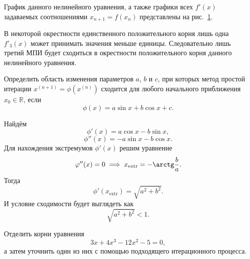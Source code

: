 \documentclass[a4paper]{article}
\begin{document}
\begin{sol}
График данного нелинейного уравнения, а также графики
всех $f'(x)$ задаваемых соотношениями $x_{n+1}=f(x_n)$
представлены на рис.~\ref{fig:1}.\begin{figure}[]
	\centering
	\caption{}
	\label{fig:1}
\end{figure}
В некоторой окрестности единственного
положительного корня лишь одна $f'_3(x)$ может принимать значения
меньше единицы. Следовательно лишь третий МПИ будет сходиться
в окрестности положительного корня данного нелинейного уравнения.
\end{sol} 
\begin{hiProb}[11.1а]
Определить область изменения параметров $a$, $b$ и $c$, при
которых метод простой итерации $x^{(n+1)}=\phi\left( x^{(n)} \right) $ сходится для любого начального приближения $x_0 \in \mathbb{R}$, если 
\[
	\phi(x)=a \sin x +b \cos x+c
.\] 
\end{hiProb}
\begin{sol}
Найдём
\[
	\phi'(x)=a \cos x-b \sin x
 ,\] 
\[
	\phi''(x)=-a \sin x- b \cos x
.\] 
Для нахождения экстремумов $\phi'(x)$ решим уравнение
\[
	\phi''(x)=0 \implies x_\text{extr} = -\arctg \frac{b}{a}
.\]
Тогда
\[
	\phi'(x_{\text{extr}})=\sqrt{a^2+b^2} 
.\] 
И условие сходимости будет выглядеть как
\[
\sqrt{a^2+b^2} <1
.\] 
\end{sol}
\begin{hiProb}[12.4б]
Отделить корни уравнения
\[
3x+4x^3-12x^2-5=0
 ,\] 
а затем уточнить один из них с помощью подходящего итерационного
процесса.
\end{hiProb}
\end{document}
